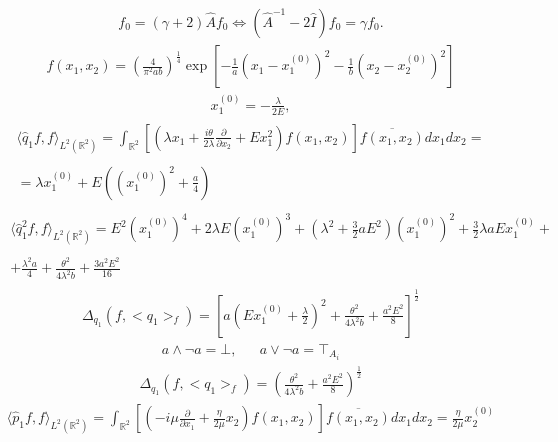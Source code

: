 \begin{align*}f_0 =(\gamma +2) \widehat{A} f_0 \Leftrightarrow \left(\widehat{A}^{-1} - 2 \widehat{I} \right)f_0= \gamma f_0.\end{align*}
\begin{align*}f (x_1, x_2) = \left(\frac{4}{\pi^2 ab} \right)^{\frac{1}{4}} \exp \left[ - \frac{1}{a} (x_1 -x_1^{(0)})^2 - \frac{1}{b} (x_2 - x_2^{(0)})^2 \right]\end{align*}
\begin{align*}x_1^{(0)} = - \frac{\lambda}{2E},\end{align*}
\begin{align*}\begin{array}{c}\langle \widehat{q}_1f, f \rangle_{L^2 (\mathbb{R}^2)}= \int_{\mathbb{R}^2} \left[\left(\lambda x_1 + \frac{i \theta}{2 \lambda} \frac{\partial}{\partial x_2} + E x_1^2 \right)f (x_1, x_2) \right] \overline{f (x_1, x_2)} dx_1 dx_2 =\\\\= \lambda x_1^{(0)} + E \left((x_1^{(0)})^2 + \frac{a}{4} \right)\end{array}\end{align*}
\begin{align*}\begin{array}{c}\langle \widehat{q}_1^2 f,f \rangle_{L^2 (\mathbb{R}^2)}=E^2 (x_1^{(0)})^4 + 2 \lambda E (x_1^{(0)})^3 + \left(\lambda^2 + \frac{3}{2} a E^2 \right) (x_1^{(0)})^2 + \frac{3}{2} \lambda a E x_1^{(0)} + \\\\+\frac{\lambda^2 a}{4} + \frac{\theta^2}{4 \lambda^2 b} + \frac{3 a^2 E^2}{16}\end{array}\end{align*}
\begin{align*}\Delta_{q_1} (f, <q_1>_f) = \left[ a \left( E x_1^{(0)} + \frac{\lambda}{2} \right)^2 + \frac{\theta^2}{4 \lambda^2 b} + \frac{a^2 E^2}{8} \right]^{\frac{1}{2}}\end{align*}
\begin{align*}a \wedge \neg a = \bot, &&a \vee \neg a = \top_{A_i}\end{align*}
\begin{align*}\Delta_{q_1} (f, <q_1>_f) =\left( \frac{\theta^2}{4 \lambda^2 b} + \frac{a^2 E^2}{8} \right)^{\frac{1}{2}}\end{align*}
\begin{align*}\langle \widehat{p}_1 f ,f \rangle_{L^2 (\mathbb{R}^2)}= \int_{\mathbb{R}^2} \left[\left(-i \mu \frac{\partial}{\partial x_1} + \frac{\eta}{2 \mu} x_2 \right)f (x_1, x_2) \right] \overline{f (x_1, x_2)} dx_1 dx_2 = \frac{\eta}{2 \mu} x_2^{(0)}\end{align*}

